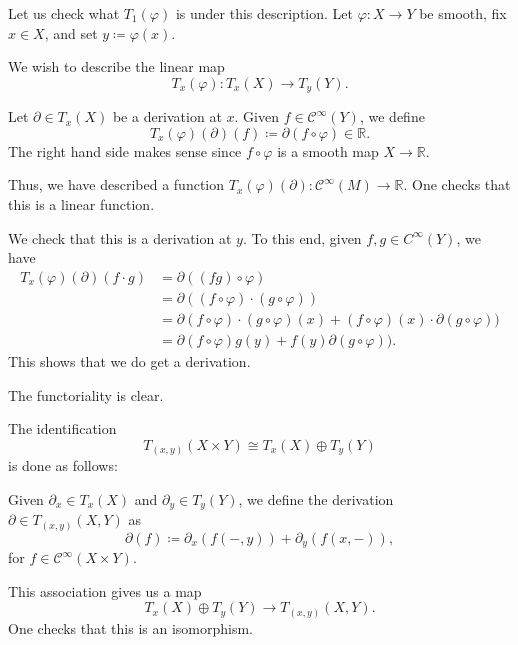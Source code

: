\documentclass[12pt]{article}
\begin{document}
\begin{rem} \label{rem:differential-on-derivations}
	Let us check what $T_{1}(\varphi)$ is under this description. 
	Let $\varphi \colon X \to Y$ be smooth, fix $x \in X$, and set $y \coloneqq \varphi(x)$. 

	We wish to describe the linear map
	\begin{equation*} 
		T_{x}(\varphi) \colon T_{x}(X) \to T_{y}(Y).
	\end{equation*}

	Let $\partial \in T_{x}(X)$ be a derivation at $x$. 
	Given $f \in \mathcal{C}^{\infty}(Y)$, we define
	\begin{equation*} 
		T_{x}(\varphi)(\partial)(f) \coloneqq \partial(f \circ \varphi) \in \mathbb{R}.
	\end{equation*}
	The right hand side makes sense since $f \circ \varphi$ is a smooth map $X \to \mathbb{R}$. 

	Thus, we have described a function $T_{x}(\varphi)(\partial) \colon \mathcal{C}^{\infty}(M) \to \mathbb{R}$. 
	One checks that this is a linear function.

	We check that this is a derivation at $y$. To this end, given $f, g \in C^{\infty}(Y)$, we have
	\begin{align*} 
		T_{x}(\varphi)(\partial)(f \cdot g) &= \partial((fg) \circ \varphi) \\
		&= \partial((f \circ \varphi) \cdot (g \circ \varphi)) \\
		&= \partial(f \circ \varphi) \cdot (g \circ \varphi)(x) + (f \circ \varphi)(x) \cdot \partial(g \circ \varphi)) \\ 
		&= \partial(f \circ \varphi) g(y) + f(y) \partial(g \circ \varphi)). 
	\end{align*}
	This shows that we do get a derivation.

	The functoriality is clear.
\end{rem}

\begin{rem} \label{rem:identification-product-tangent-spaces-derivations}
	The identification
	\begin{equation*} 
		T_{(x, y)}(X \times Y) \cong T_{x}(X) \oplus T_{y}(Y)
	\end{equation*}
	is done as follows:

	Given $\partial_{x} \in T_{x}(X)$ and $\partial_{y} \in T_{y}(Y)$, we define the derivation $\partial \in T_{(x, y)}(X, Y)$ as
	\begin{equation*} 
		\partial(f) \coloneqq \partial_{x}(f(-, y)) + \partial_{y}(f(x, -)),
	\end{equation*}
	for $f \in \mathcal{C}^{\infty}(X \times Y)$.

	This association gives us a map
	\begin{equation*} 
		T_{x}(X) \oplus T_{y}(Y) \to T_{(x, y)}(X, Y).
	\end{equation*}
	One checks that this is an isomorphism.
\end{rem}
\end{document}
